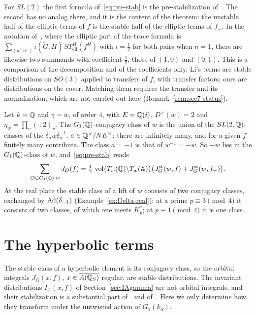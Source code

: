 For $SL(2)$ the first formula of~\eqref{eq:pre-stab} is the
pre-stabilization of~\cite[\S5]{LL79}. The second has no analog there, and
it is the content of the theorem: the unstable half of the elliptic terms
of $f$ is the stable half of the elliptic terms of $f_-$. In the notation
of~\cite[Th\'eor\`eme~5.2.6]{Li15}, where the elliptic part of the trace
formula is $\sum_{(n',n'')}\iota(\tilde G,H)\,ST^H_{\mathrm{ell}}(f^H)$ with
$\iota=\frac12$ for both pairs when $n=1$, there are likewise two
summands with coefficient $\frac12$, those of $(1,0)$ and $(0,1)$. This is
a comparison of the decomposition and of the coefficients only. Li's terms
are stable distributions on $SO(3)$ applied to transfers of $f$, with
transfer factors; ours are distributions on the cover. Matching them
requires the transfer and its normalization, which are not carried out
here (Remark~\ref{rem:sec7-status}).

\begin{example}\label{ex:order4-stable}
Let $k=\mathbb{Q}$ and $\gamma=w$, of order $4$, with $E=\mathbb{Q}(i)$, $D^+(w)=2$ and
$\eta_w=\prod_v(\cdot,2)_v$. The $G_1(\mathbb{Q})$-conjugacy class of $w$ is the
union of the $SL(2,\mathbb{Q})$-classes of the $\delta_aw\delta_a^{-1}$,
$a\in\mathbb{Q}^\times/N E^\times$; there are infinitely many, and for a given $f$
finitely many contribute. The class $a=-1$ is that of
$w^{-1}=-w$. So $-w$ lies in the $G_1(\mathbb{Q})$-class of $w$,
and~\eqref{eq:pre-stab} reads
\[
\sum_{\mathcal O\subset G_1(\mathbb{Q})\cdot w}J_{\mathcal O}(f)=\tfrac12\,
\operatorname{vol}\bigl(T_w(\mathbb{Q})\backslash T_w(\mathbb{A})\bigr)\bigl(
J^{\mathrm{st}}_G(w,f)+J^{\mathrm{st}}_G(w,f_-)\bigr).
\]
At the real place the stable class of a lift of $w$ consists of two
conjugacy classes, exchanged by $\operatorname{Ad}(\delta_{-1})$
(Example~\ref{ex:Delta-real}); at a prime $p\equiv3\pmod4$ it consists of
two classes, of which one meets $K_p^*$; at $p\equiv1\pmod4$ it is one
class.
\end{example}

\section{The hyperbolic terms}\label{sec:hyperbolic-gl2}

The stable class of a hyperbolic element is its conjugacy class, so the
orbital integrals $J_G(x,f)$, $x\in\overline{A(\mathbb{Q}_S)}$ regular, are stable
distributions. The invariant distributions $I_A(x,f)$ of
Section~\ref{sec:IAgamma} are not orbital integrals, and their
stabilization is a substantial part of~\cite{LL79} and of~\cite{Li21}. Here
we only determine how they transform under the untwisted action of
$G_1(k_S)$.

